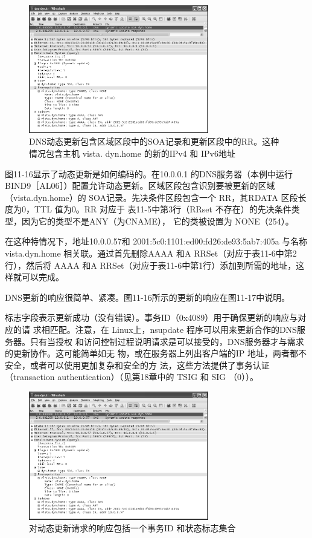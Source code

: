 \begin{figure}[!htb]
  \centering
  \includegraphics[width=0.7\textwidth]{imgs/11/11-16.png}
  \caption{DNS动态更新包含区域区段中的SOA记录和更新区段中的RR。这种情况包含主机 vista.
  dyn.home 的新的IPv4 和 IPv6地址}
\end{figure}

图11-16显示了动态更新是如何编码的。在10.0.0.1 的DNS服务器（本例中运行
BIND9［AL06］）配置允许动态更新。区域区段包含识别要被更新的区域（vista.dyn.home）的
SOA记录。先决条件区段包含一个 RR，其RDATA 区段长度为0，TTL 值为0。RR 对应于
表11-5中第3行（RRset 不存在）的先决条件类型，因为它的类型不是ANY（为CNAME），
它的类被设置为 NONE（254）。

在这种特情况下，地址10.0.0.57和 2001:5c0:1101:ed00:fd26:de93:5ab7:405a 与名称
vista.dyn.home 相关联。通过首先删除AAAA 和A RRSet（对应于表11-6中第2行），然后将
AAAA 和A RRSet（对应于表11-6中第1行）添加到所需的地址，这样就可以完成。

DNS更新的响应很简单、紧凑。图11-16所示的更新的响应在图11-17中说明。

标志字段表示更新成功（没有错误）。事务ID（0x4089）用于确保更新的响应与对应的请
求相匹配。注意，在 Linux上，nsupdate 程序可以用来更新合作的DNS服务器。只有当授权
和访问控制过程说明请求是可以接受的，DNS服务器才与需求的更新协作。这可能简单如无
物，或在服务器上列出客户端的IP 地址，两者都不安全，或者可以使用更加复杂和安全的方
法，这些方法提供了事务认证 （transaction authentication）（见第18章中的 TSIG 和 SIG （0））。

\begin{figure}[!htb]
  \centering
  \includegraphics[width=0.7\textwidth]{imgs/11/11-16.png}
  \caption{对动态更新请求的响应包括一个事务ID 和状态标志集合}
\end{figure}

